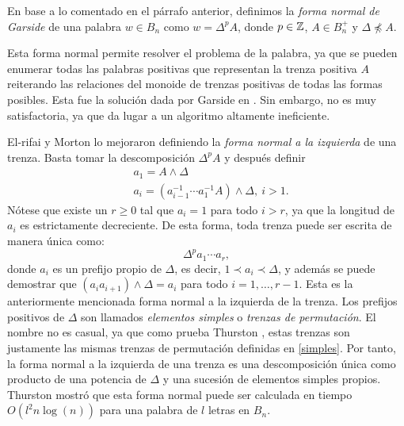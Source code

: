 \documentclass[TFG.tex]{subfiles}
\begin{document}
\begin{defi}
En base a lo comentado en el párrafo anterior, definimos la \emph{forma normal de Garside} de una palabra $w\in B_n$ como $w=\Delta^pA$, donde $p\in\mathbb{Z}$, $A\in B_n^+$ y $\Delta\not\preccurlyeq A$. 
\end{defi}

Esta forma normal permite resolver el problema de la palabra, ya que se pueden enumerar todas las palabras positivas que representan la trenza positiva $A$ reiterando las relaciones del monoide de trenzas positivas de todas las formas posibles. Esta fue la solución dada por Garside en \cite{Garside}. Sin embargo, no es muy satisfactoria, ya que da lugar a un algoritmo altamente ineficiente.


El-rifai y Morton \cite{EM} lo mejoraron definiendo la \emph{forma normal a la izquierda} de una trenza. Basta tomar la descomposición $\Delta^pA$ y después definir %
\begin{align*}
&a_1=A\land\Delta\\
&a_i=(a_{i-1}^{-1}\cdots a_1^{-1}A)\land\Delta,\ i>1.
\end{align*}
Nótese que existe un $r\geq 0$ tal que $a_i=1$ para todo $i>r$, ya que la longitud de $a_i$ es estrictamente decreciente. De esta forma, toda trenza puede ser escrita de manera única como:
$$\Delta^p a_1\cdots a_r,$$
donde $a_i$ es un prefijo propio de $\Delta$, es decir, $1\prec a_i\prec\Delta$, y además se puede demostrar que $(a_ia_{i+1})\land\Delta=a_i$ \cite{Thurston} para todo $i=1,\dots, r-1$. Esta es la anteriormente mencionada forma normal a la izquierda de la trenza. Los prefijos positivos de $\Delta$ son llamados \emph{elementos simples} o \emph{trenzas de permutación}. El nombre no es casual, ya que como prueba Thurston \cite{Thurston}, estas trenzas son justamente las mismas trenzas de permutación definidas en \ref{simples}. Por tanto, la forma normal a la izquierda de una trenza es una descomposición única como producto de una potencia de $\Delta$ y una sucesión de elementos simples propios. Thurston \cite{Thurston} mostró que esta forma normal puede ser calculada en tiempo $O(l^2n\log(n))$ para una palabra de $l$ letras en $B_n$. 
\end{document}
